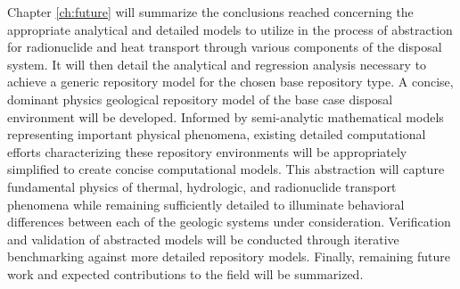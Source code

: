 
Chapter \ref{ch:future} will summarize the conclusions reached concerning the 
appropriate analytical and detailed models to utilize in the process of 
abstraction for radionuclide and heat transport through various components of 
the disposal system. It will then detail the analytical and regression analysis 
necessary to achieve a generic repository model for the chosen 
base repository type. A concise, dominant physics geological repository model of 
the base case disposal environment will be developed. Informed by semi-analytic 
mathematical models representing important physical phenomena, existing detailed 
computational efforts characterizing these repository environments will be 
appropriately simplified to create concise computational models. This 
abstraction will capture fundamental physics of thermal, hydrologic, and 
radionuclide transport phenomena while remaining sufficiently detailed to 
illuminate behavioral differences between each of the geologic systems under 
consideration.  Verification and validation of abstracted models will be 
conducted through iterative benchmarking against more detailed repository 
models. Finally, remaining future work and expected contributions to the 
field will be summarized. 


% 

